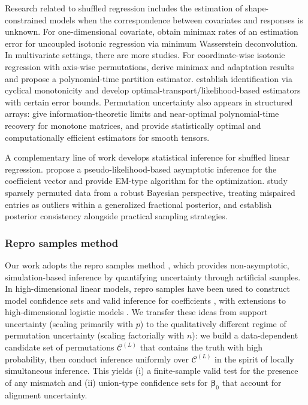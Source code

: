 \documentclass[11pt, reqno]{amsart}
\newcommand{\mC}{\mathcal{C}}
\newcommand{\1}{\mbox{1}\hspace{-0.25em}\mbox{l}}
\theoremstyle{definition}\newtheorem{problem}{Problem}[section]
\theoremstyle{definition}\newtheorem{definition}[problem]{Definition}
\theoremstyle{remark}\newtheorem{assumption}{Assumption}
\theoremstyle{remark}\newtheorem{remark}[problem]{Remark}
\theoremstyle{definition}\newtheorem{example}[problem]{Example}
\theoremstyle{plain}\newtheorem{theorem}[problem]{Theorem}
\theoremstyle{plain}\newtheorem{question}[problem]{Question}
\theoremstyle{plain}\newtheorem{lemma}[problem]{Lemma}
\theoremstyle{plain}\newtheorem{proposition}[problem]{Proposition}
\theoremstyle{plain}\newtheorem{corollary}[problem]{Corollary}
\theoremstyle{plain}\newtheorem{conjecture}[problem]{Conjecture}
\begin{document}
Research related to shuffled regression includes the estimation of shape-constrained models when the correspondence between covariates and responses is unknown.
For one-dimensional covariate, \cite{rigollet2019uncoupled} obtain minimax rates of an estimation error for uncoupled isotonic regression via minimum Wasserstein deconvolution. 
In multivariate settings, there are more studies.
For coordinate-wise isotonic regression with axis-wise permutations, \cite{pananjady2022isotonic} derive minimax and adaptation results and propose a polynomial-time partition estimator. \cite{slawski2024permuted} establish identification via cyclical monotonicity and develop optimal-transport/likelihood-based estimators with certain error bounds. Permutation uncertainty also appears in structured arrays: \cite{ma2021optimal} give information-theoretic limits and near-optimal polynomial-time recovery for monotone matrices, and \cite{lee2025statistical} provide statistically optimal and computationally efficient estimators for smooth tensors. 

A complementary line of work develops statistical inference for shuffled linear regression. \cite{slawski2021pseudo} propose a pseudo-likelihood-based asymptotic inference for the coefficient vector and provide EM-type algorithm for the optimization. \cite{chakraborty2024learning} study sparsely permuted data from a robust Bayesian perspective, treating mispaired entries as outliers within a generalized fractional posterior, and establish posterior consistency alongside practical sampling strategies.


\subsubsection{Repro samples method}


Our work adopts the repro samples method \citep{xie2022repro,xie2024repro}, which provides non-asymptotic, simulation-based inference by quantifying uncertainty through artificial samples. 
In high-dimensional linear models, repro samples have been used to construct model confidence sets and valid inference for coefficients \citep{wang2022finite}, with extensions to high-dimensional logistic models \citep{hou2025repro}. 
We transfer these ideas from support uncertainty (scaling primarily with $p$) to the qualitatively different regime of permutation uncertainty (scaling factorially with $n$): we build a data-dependent candidate set of permutations $\mC^{(L)}$ that contains the truth with high probability, then conduct inference uniformly over $\mC^{(L)}$ in the spirit of locally simultaneous inference. 
This yields (i) a finite-sample valid test for the presence of any mismatch and (ii) union-type confidence sets for $\bm{\beta}_0$ that account for alignment uncertainty. 
\end{document}

